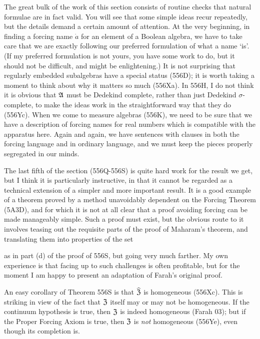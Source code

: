 {The great bulk of the work of this section consists of routine checks that
natural formulae are in fact valid.   You will see that some simple ideas
recur repeatedly, but the details demand a certain amount of attention.
At the very beginning, in finding a forcing name $\dot a$ for an
element of a Boolean algebra, we have to take care that we are exactly
following our preferred formulation of what a name `is'.   (If my preferred
formulation is not yours, you have some work to do, but it should not be
difficult, and might be enlightening.)   It is not
surprising that regularly embedded subalgebras have a special status
(556D);  it is worth taking a moment to think about why it matters so much
(556Xa).   In 556H, I do not think it is obvious that $\frak A$ must be
Dedekind complete, rather than just Dedekind $\sigma$-complete,
to make the ideas work in the straightforward way that they do (556Yc).
When we come to measure algebras (556K), we need to be sure that we have a
description of forcing names for real numbers which is compatible with the
apparatus here.   Again and again, we have sentences with clauses in both
the forcing language and in ordinary language, and we must keep the pieces
properly segregated in our minds.

The last fifth of the section (556Q-556S) %
is quite hard work for the result we get, but I think it is particularly
instructive, in that it cannot be regarded as a technical extension of a
simpler and more important
result.   It is a good example of a theorem proved by a method
unavoidably dependent on the Forcing Theorem (5A3D), and for which it is
not at all clear that a proof avoiding forcing can be made manageably
simple.   Such a proof must exist, but the obvious route to it involves
teasing out the requisite parts of the proof of Maharam's theorem, and
translating them into properties of the set


\noindent as in part (d) of the proof of 556S, but going very much farther.
My own experience is that facing up to such challenges is often profitable,
but for the moment I am happy to present an adaptation of Farah's
original proof.

An easy corollary of Theorem 556S is that $\widehat{\frak Z}$ is
homogeneous (556Xc).   This is striking in view of the fact that $\frak Z$
itself may or may not be homogeneous.   If the continuum hypothesis is
true, then $\frak Z$ is indeed homogeneous ({\smc Farah 03}); %
but if
the Proper Forcing Axiom is true, then $\frak Z$ is {\it not} homogeneous
(556Ye), even though its completion is.
}%

\discrpage




